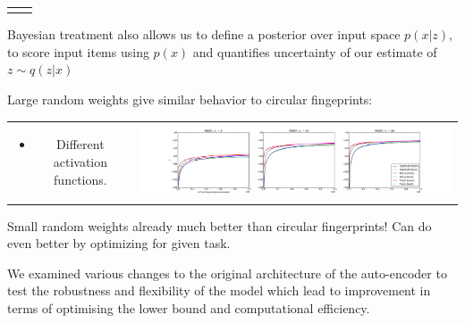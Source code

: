 \documentclass[landscape,a0b,final,a4resizeable]{include/a0poster}
\begin{document}
\begin{poster}
\begin{multicols}{3}
\begin{tabular}{cc}
\begin{minipage}[c]{0.5\columnwidth}
\begin{center}
\end{center}
\end{minipage}
\end{tabular}
Bayesian treatment also allows us to define a posterior over input space $p(x|z)$, to score input items using $p(x)$ and quantifies uncertainty of our estimate of $z\sim q(z|x)$

\newpage %



Large random weights give similar behavior to circular fingeprints:
\begin{tabular}{cc}
\begin{minipage}[c]{0.25\columnwidth}
\begin{itemize}
\item Different activation functions.
\end{itemize}
\end{minipage} & 
\begin{minipage}[c]{0.75\columnwidth}
\includegraphics[width=1.0\columnwidth, clip, trim=4mm 0mm 4mm 4mm]{../res/mnist_activations}
\end{minipage}
\end{tabular}

\vspace{0.5em}

Small random weights already much better than circular fingerprints!
Can do even better by optimizing for given task.

\vspace{1in}


We examined various changes to the original architecture of the auto-encoder to test the robustness and flexibility of the model which lead to improvement in terms of optimising the lower bound and computational efficiency.


\end{multicols}
\end{poster}
\end{document}
